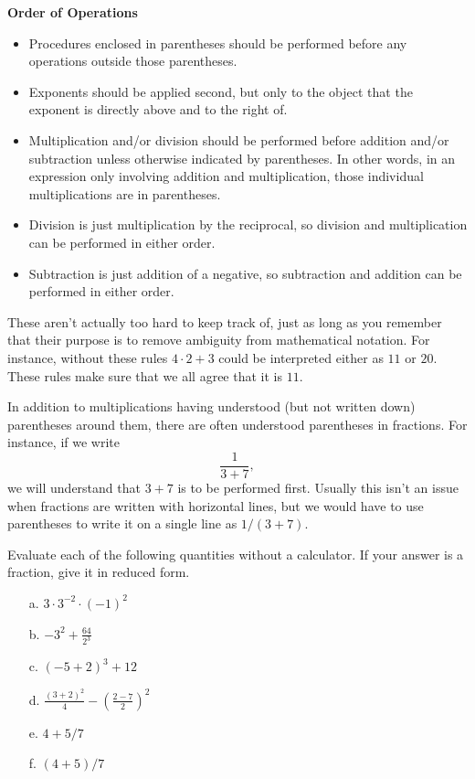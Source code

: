 \begin{tcolorbox}
{\bf Order of Operations}
\begin{itemize}
\item Procedures enclosed in parentheses should be performed before any operations outside those parentheses.
\item Exponents should be applied second, but only to the object that the exponent is directly above and to the right of.
\item Multiplication and/or division should be performed before addition and/or subtraction unless otherwise indicated by parentheses. In other words, in an expression only involving addition and multiplication, those individual multiplications are in parentheses.
\item Division is just multiplication by the reciprocal, so division and multiplication can be performed in either order.
\item Subtraction is just addition of a negative, so subtraction and addition can be performed in either order.
\end{itemize}
\end{tcolorbox}

These aren't actually too hard to keep track of, just as long as you remember that their purpose is to remove ambiguity from mathematical notation. For instance, without these rules $4\cdot 2 +3$ could be interpreted either as $11$ or $20$. These rules make sure that we all agree that it is $11$. 
\par 
In addition to multiplications having understood (but not written down) parentheses around them, there are often understood parentheses in fractions. For instance, if we write
\[
\frac{1}{3+7},
\]  
we will understand that $3+7$ is to be performed first. Usually this isn't an issue when fractions are written with horizontal lines, but we would have to use parentheses to write it on a single line as $1/(3+7)$.

\begin{question} Evaluate each of the following quantities without a calculator. If your answer is a fraction, give it in reduced form.
\begin{enumerate}
\item[a.] $3\cdot 3^{-2}\cdot(-1)^2$
\item[b.] $-3^2+\frac{64}{2^3}$
\item[c.] $(-5+2)^3+12$
\item[d.] $\frac{(3+2)^2}{4} - \left(\frac{2-7}{2}\right)^2$
\item[e.] $4+5/7$
\item[f.] $(4+5)/7$
\end{enumerate}
\end{question}

